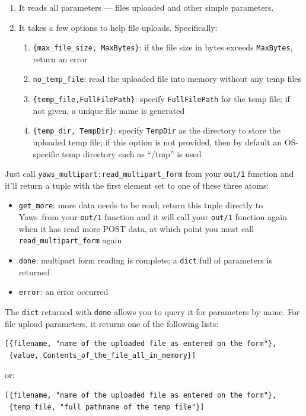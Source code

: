 \documentclass[11pt,oneside,english]{book}
\newcommand{\Yaws}            %
        {{\sc Yaws}}
\begin{document}
\begin{enumerate}
\item It reads all parameters --- files uploaded and other simple parameters.
\item It takes a few options to help file uploads. Specifically:
\begin{enumerate}
\item \verb+{max_file_size, MaxBytes}+: if the file size in bytes
  exceeds \verb+MaxBytes+, return an error
\item \verb+no_temp_file+: read the uploaded file into memory without
  any temp files
\item \verb+{temp_file,FullFilePath}+: specify \verb+FullFilePath+ for
  the temp file; if not given, a unique file name is generated
\item \verb+{temp_dir, TempDir}+: specify \verb+TempDir+ as the
  directory to store the uploaded temp file; if this option is not
  provided, then by default an OS-specific temp directory such as
  ``/tmp'' is used
\end{enumerate}
\end{enumerate}

Just call \verb+yaws_multipart:read_multipart_form+ from your
\verb+out/1+ function and it'll return a tuple with the first element
set to one of these three atoms:

\begin{itemize}
\item \verb+get_more+: more data needs to be read; return this tuple
  directly to \Yaws\  from your \verb+out/1+ function and it will call
  your \verb+out/1+ function again when it has read more POST data, at
  which point you must call \verb+read_multipart_form+ again
\item \verb+done+: multipart form reading is complete; a
  \verb+dict+ full of parameters is returned
\item \verb+error+: an error occurred
\end{itemize}

The \verb+dict+ returned with \verb+done+ allows you to query it for
parameters by name. For file upload parameters, it returns one of the
following lists:

\begin{verbatim}
[{filename, "name of the uploaded file as entered on the form"},
 {value, Contents_of_the_file_all_in_memory}]
\end{verbatim}

or:

\begin{verbatim}
[{filename, "name of the uploaded file as entered on the form"},
 {temp_file, "full pathname of the temp file"}]
\end{verbatim}
\end{document}
